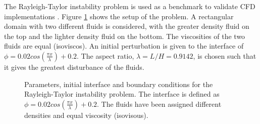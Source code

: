 The Rayleigh-Taylor instability problem is used as a benchmark to validate CFD implementations \cite{VANKEKEN1997}. Figure \ref{RT2DSETUP} shows the setup of the problem. A rectangular domain with two different fluids is considered, with the greater density fluid on the top and the lighter density fluid on the bottom. The viscosities of the two fluids are equal (isoviscos). An initial perturbation is given to the interface of $\phi=0.02cos(\frac{\pi x}{\lambda}) + 0.2$. The aspect ratio, $\lambda = L/H = 0.9142$, is chosen such that it gives the greatest disturbance of the fluids.
%
\begin{figure}
\center
{}
\caption{Parameters, initial interface and boundary conditions for the Rayleigh-Taylor instability problem. The interface is defined as $\phi=0.02cos(\frac{\pi x}{\lambda}) + 0.2$. The fluids have been assigned different densities and equal viscosity (isovisous).}
\label{RT2DSETUP}
\end{figure}

